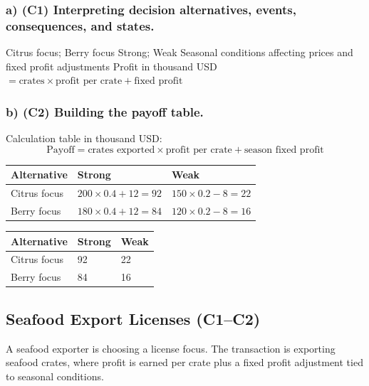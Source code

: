 	\subsubsection*{a) \textbf{(C1)} Interpreting decision alternatives, events, consequences, and states.}
	\label{subsec:problem21-fruit-export-permits-c1}
	\DecisionElementsTable
	{Citrus focus; Berry focus}
	{Strong; Weak}
	{Seasonal conditions affecting prices and fixed profit adjustments}
	{Profit in thousand USD $= \text{crates} \times \text{profit per crate} + \text{fixed profit}$}
	
	
	\subsubsection*{b) \textbf{(C2)} Building the payoff table.}
	\label{subsec:problem21-fruit-export-permits-c2}
	Calculation table in thousand USD:
	\[
	\text{Payoff}=\text{crates exported}\times\text{profit per crate}+\text{season fixed profit}
	\]
	\begin{center}
		\begin{tabular}{lll}
			\toprule
			Alternative & Strong & Weak \\
			\midrule
			Citrus focus & $200 \times 0.4 + 12 = 92$ & $150 \times 0.2 - 8 = 22$ \\
			Berry focus & $180 \times 0.4 + 12 = 84$ & $120 \times 0.2 - 8 = 16$ \\
			\bottomrule
		\end{tabular}
	\end{center}
	
	\begin{center}
		\begin{tabular}{lll}
			\toprule
			Alternative & Strong & Weak \\
			\midrule
			Citrus focus & 92 & 22 \\
			Berry focus & 84 & 16 \\
			\bottomrule
		\end{tabular}
	\end{center}
	
	
	\subsection{Seafood Export Licenses (C1--C2)}
	\label{sec:problem14-seafood-export-licenses-c1-c2}
	A seafood exporter is choosing a license focus. The transaction is exporting seafood crates, where profit is earned per crate plus a fixed profit adjustment tied to seasonal conditions.
	
